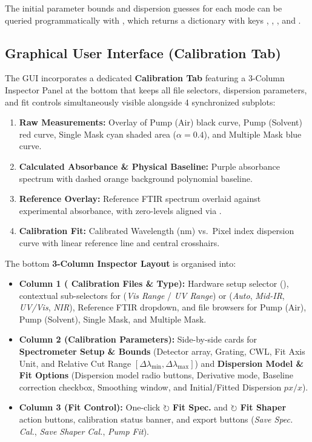 The initial parameter bounds and dispersion guesses for each mode can be
queried programmatically with ,
which returns a dictionary with keys , , ,
 and .

\subsection{Graphical User Interface (Calibration Tab)}

The GUI incorporates a dedicated \textbf{Calibration Tab} featuring a 3-Column Inspector Panel at the bottom that keeps all file selectors, dispersion parameters, and fit controls simultaneously visible alongside 4 synchronized subplots:
\begin{enumerate}
  \item \textbf{Raw Measurements:} Overlay of Pump (Air) black curve, Pump (Solvent) red curve, Single Mask cyan shaded area ($\alpha=0.4$), and Multiple Mask blue curve.
  \item \textbf{Calculated Absorbance \& Physical Baseline:} Purple absorbance spectrum with dashed orange background polynomial baseline.
  \item \textbf{Reference Overlay:} Reference FTIR spectrum overlaid against experimental absorbance, with zero-levels aligned via .
  \item \textbf{Calibration Fit:} Calibrated Wavelength (nm) vs.\ Pixel index dispersion curve with linear reference line and central crosshairs.
\end{enumerate}

The bottom \textbf{3-Column Inspector Layout} is organised into:
\begin{itemize}
  \item \textbf{Column 1 ( Calibration Files \& Type):} Hardware setup selector (), contextual sub-selectors for  (\emph{Vis Range} / \emph{UV Range}) or  (\emph{Auto}, \emph{Mid-IR}, \emph{UV/Vis}, \emph{NIR}), Reference FTIR dropdown, and file browsers for Pump (Air), Pump (Solvent), Single Mask, and Multiple Mask.
  \item \textbf{Column 2 (Calibration Parameters):} Side-by-side cards for \textbf{Spectrometer Setup \& Bounds} (Detector array, Grating, CWL, Fit Axis Unit, and Relative Cut Range $[\Delta\lambda_{\min}, \Delta\lambda_{\max}]$) and \textbf{Dispersion Model \& Fit Options} (Dispersion model radio buttons, Derivative mode, Baseline correction checkbox, Smoothing window, and Initial/Fitted Dispersion $px/x$).
  \item \textbf{Column 3 (Fit Control):} One-click \textbf{$\circlearrowright$ Fit Spec.} and \textbf{$\circlearrowright$ Fit Shaper} action buttons, calibration status banner, and export buttons (\emph{Save Spec. Cal.}, \emph{Save Shaper Cal.}, \emph{Pump Fit}).
\end{itemize}

